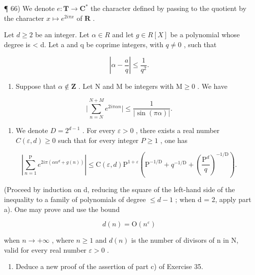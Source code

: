 ¶ 66) We denote \(e\colon \mathbf{T}\to \mathbf{C}^{*}\) the character defined by passing to the quotient by the character \(x\mapsto e^{2i\pi x}\) of \(\mathbf{R}\) .

Let \(d \geqslant 2\) be an integer. Let \(\alpha \in R\) and let \(g \in R[X]\) be a polynomial whose degree is \textless{} d. Let a and q be coprime integers, with \(q \neq 0\) , such that

\[
\left| \alpha - \frac {a}{q} \right| \leqslant \frac {1}{q ^ {2}}.
\]

\begin{enumerate}
\def\labelenumi{\alph{enumi})}
\tightlist
\item
  Suppose that \(\alpha \notin \mathbf{Z}\) . Let N and M be integers with \(\mathrm{M} \geqslant 0\) . We have
\end{enumerate}

\[
\Big | \sum_ {n = N} ^ {N + M} e ^ {2 i \pi \alpha n} \Big | \leqslant \frac {1}{| \sin (\pi \alpha) |}.
\]

\begin{enumerate}
\def\labelenumi{\alph{enumi})}
\setcounter{enumi}{1}
\tightlist
\item
  We denote \(D = 2^{d-1}\) . For every \(\varepsilon > 0\) , there exists a real number \(C(\varepsilon, d) \geqslant 0\) such that for every integer \(P \geqslant 1\) , one has
\end{enumerate}

\[
\left| \sum_ {n = 1} ^ {\mathrm{P}} e ^ {2 i \pi (\alpha n ^ {d} + g (n))} \right| \leqslant \mathrm{C} (\varepsilon , d) \mathrm{P} ^ {1 + \varepsilon} \left(\mathrm{P} ^ {- 1 / \mathrm{D}} + q ^ {- 1 / \mathrm{D}} + \left(\frac {\mathrm{P} ^ {d}}{q}\right) ^ {- 1 / \mathrm{D}}\right).
\]

(Proceed by induction on d, reducing the square of the left-hand side of the inequality to a family of polynomials of degree \(\leqslant d - 1\) ; when d = 2, apply part a). One may prove and use the bound

\[
d (n) = \mathrm{O} (n ^ {\varepsilon})
\]

when \(n \to +\infty\) , where \(n \geqslant 1\) and \(d(n)\) is the number of divisors of n in N, valid for every real number \(\varepsilon > 0\) .

\begin{enumerate}
\def\labelenumi{\alph{enumi})}
\setcounter{enumi}{2}
\tightlist
\item
  Deduce a new proof of the assertion of part c) of Exercise 35.
\end{enumerate}

